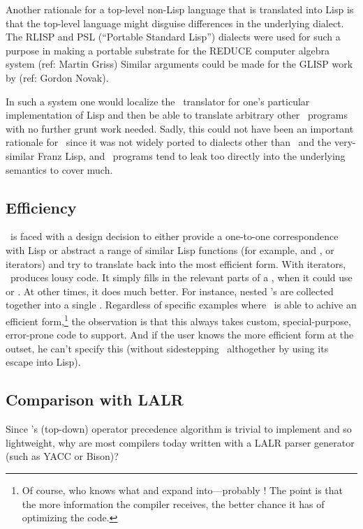 Another rationale for a top-level non-Lisp language that
is translated into Lisp is that the top-level language might
disguise differences in the underlying dialect.  The RLISP and
PSL (``Portable Standard Lisp'') dialects were used for such
a purpose in making a portable substrate for the REDUCE computer
algebra system (ref: Martin Griss)  Similar
arguments could be made for the GLISP  work by (ref: Gordon Novak).

In such a system one would localize the \cgol\ translator for one's
particular implementation of Lisp and then be able to translate
arbitrary other \cgol\ programs with no further grunt work
needed.  Sadly, this could not have been an important rationale for
\cgol\ since it was not widely ported to dialects other than \ml\ and
the very-similar Franz Lisp, and \cgol\ programs tend to leak too
directly into the underlying semantics to cover much.

\subsection {Efficiency}

\cgol\ is faced with a design decision to either provide a one-to-one
correspondence with Lisp or abstract a range of similar Lisp functions (for
example,  and , or iterators) and try to translate back
into the most efficient form.  With iterators, \cgol\ produces lousy code.
It simply fills in the relevant parts of a , when it could use
 or .  At other times, it does much better.  For
instance, nested 's are collected together into a single
.  Regardless of specific examples where \cgol\ is able to
achive an efficient form,\footnote{Of course, who knows what 
and  expand into---probably !  The point is that the
more information the compiler receives, the better chance it  has
 of optimizing the code.} the observation is that this  always takes
custom, special-purpose, error-prone code to support.  And if the user
knows the more efficient form at the outset, he can't specify this (without
sidestepping \cgol\ althogether by using its escape into Lisp).

\subsection {Comparison with LALR}

Since \cgol's (top-down) operator precedence algorithm is trivial to
implement and so lightweight, why are most compilers today written with a
LALR parser generator (such as YACC or Bison)?

